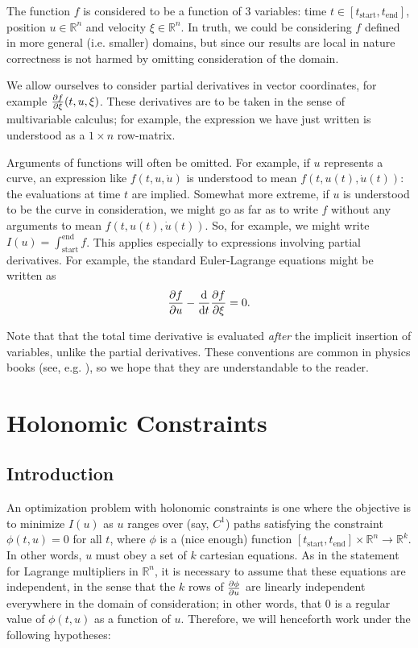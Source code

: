 \documentclass{article}
\theoremstyle{nonumberplain}
\theoremstyle{nonumberplain}
\newcommand{\R}{\mathbb{R}}
\newcommand{\tstart}{\mathrm{start}}
\newcommand{\tend}{\mathrm{end}}
\begin{document}
The function $f$ is considered to be a function of 3 variables: time $t \in [t_\tstart, t_\tend]$, position $u \in \R^n$ and velocity $\xi \in \R^n$. In truth, we could be considering $f$ defined in more general (i.e. smaller) domains, but since our results are local in nature correctness is not harmed by omitting consideration of the domain.

We allow ourselves to consider partial derivatives in vector coordinates, for example $\diffp f \xi (t, u, \xi)$. These derivatives are to be taken in the sense of multivariable calculus; for example, the expression we have just written is understood as a $1 \times n$ row-matrix.

Arguments of functions will often be omitted. For example, if $u$ represents a curve, an expression like $f(t,u,\dot u)$ is understood to mean $f(t,u(t),\dot u(t))$: the evaluations at time $t$ are implied. Somewhat more extreme, if $u$ is understood to be the curve in consideration, we might go as far as to write $f$ without any arguments to mean $f(t,u(t),\dot u(t))$. So, for example, we might write $I(u) = \int_\tstart^\tend f$. This applies especially to expressions involving partial derivatives. For example, the standard Euler-Lagrange equations might be written as
\[\diffp f u - \diff*{\diffp f \xi}t = 0.\]

Note that that the total time derivative is evaluated \emph{after} the implicit insertion of variables, unlike the partial derivatives. These conventions are common in physics books (see, e.g. \cite{goldstein}), so we hope that they are understandable to the reader.


\section{Holonomic Constraints}

\subsection{Introduction}

An optimization problem with holonomic constraints is one where the objective is to minimize $I(u)$ as $u$ ranges over (say, $C^1$) paths satisfying the constraint $\phi(t, u) = 0$ for all $t$, where $\phi$ is a (nice enough) function $[t_\tstart, t_\tend] \times \R^n \to \R^k$. In other words, $u$ must obey a set of $k$ cartesian equations. As in the statement for Lagrange multipliers in $\R^n$, it is necessary to assume that these equations are independent, in the sense that the $k$ rows of $\diffp \phi u$ are linearly independent everywhere in the domain of consideration; in other words, that 0 is a regular value of $\phi(t, u)$ as a function of $u$. Therefore, we will henceforth work under the following hypotheses:
\end{document}
